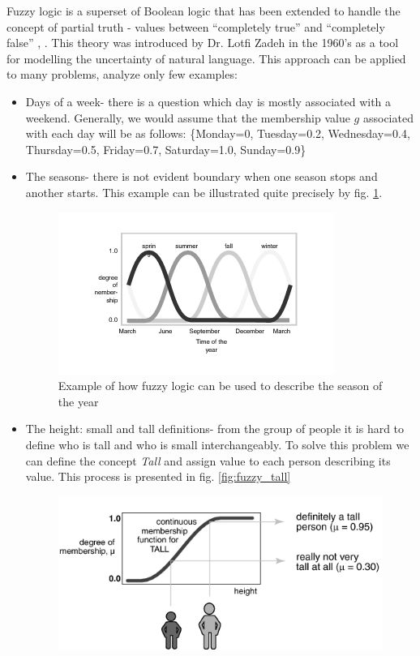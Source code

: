 Fuzzy logic is a superset of Boolean logic that 
has been extended to handle the concept of partial truth - values between ``completely 
true'' and ``completely false'' \cite{bib6}, \cite{bib12}. This theory was introduced by 
Dr. Lotfi Zadeh in the 1960's as a tool for modelling the uncertainty of natural language. 
This approach can be applied to many problems, analyze only few examples:
\begin{itemize}
    \item Days of a week- there is a question which day is mostly associated
        with a weekend. Generally, we would assume that the membership value
        $g$ associated with each day will be as follows:
        \{Monday=0, Tuesday=0.2, Wednesday=0.4, Thursday=0.5, Friday=0.7,
        Saturday=1.0, Sunday=0.9\}
    \item The seasons- there is not evident boundary when one season stops and
        another starts. This example can be illustrated quite precisely by fig.
        \ref{fig:seasons}.
        \begin{figure}[H]
            \begin{center}
                \includegraphics{fig/seasons.png}
            \end{center}
            \caption{Example of how fuzzy logic can be used to describe the
            season of the year}
            \label{fig:seasons}
        \end{figure}
    \item The height: small and tall definitions- from the group of people it
        is hard to define who is tall and who is small interchangeably. To
        solve this problem we can define the concept \textit{Tall} and assign
        value to each person describing its value. This process is presented in
        fig. \ref{fig:fuzzy_tall}
        \begin{figure}[H]
            \begin{center}
                \includegraphics{fig/fuzzy_tall.png}

\end{center}
\end{figure}
\end{itemize}
